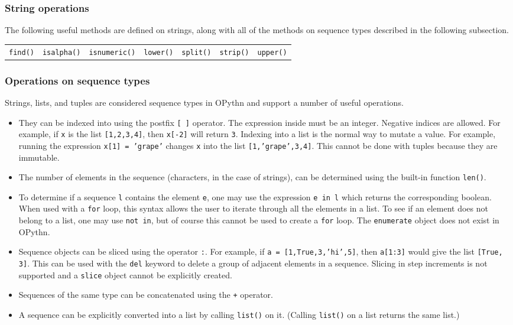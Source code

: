 \documentclass[11pt, twoside]{article}
\newcommand{\ms}{\texttt}
\begin{document}
    \subsubsection{String operations}
    The following useful methods are defined on strings, along with all of the methods on sequence types described in the following subsection.
    \begin{center}
        \begin{tabular}{ccccccc}
            \ms{find()} & \ms{isalpha()} & \ms{isnumeric()} & \ms{lower()} & \ms{split()} & \ms{strip()} & \ms{upper()}\\
    \end{tabular}
    \end{center}

    \subsubsection{Operations on sequence types}
    Strings, lists, and tuples are considered sequence types in OPythn and support a number of useful operations.
    \begin{itemize}
        \item They can be indexed into using the postfix \ms{[ ]} operator. The expression inside must be an integer. Negative indices are allowed. For example, if \ms{x} is the list \ms{[1,2,3,4]}, then \ms{x[-2]} will return \ms{3}. Indexing into a list is the normal way to mutate a value. For example, running the expression \ms{x[1] = 'grape'} changes \ms{x} into the list \ms{[1,'grape',3,4]}. This cannot be done with tuples because they are immutable.
        \item The number of elements in the sequence (characters, in the case of strings), can be determined using the built-in function \ms{len()}.
        \item To determine if a sequence \ms{l} contains the element \ms{e}, one may use the expression \ms{e in l} which returns the corresponding boolean. When used with a \ms{for} loop, this syntax allows the user to iterate through all the elements in a list. To see if an element does not belong to a list, one may use \ms{not in}, but of course this cannot be used to create a \ms{for} loop. The \ms{enumerate} object does not exist in OPythn.
        \item Sequence objects can be sliced using the operator \ms{:}. For example, if \ms{a = [1,True,3,'hi',5]}, then \ms{a[1:3]} would give the list \ms{[True, 3]}. This can be used with the \ms{del} keyword to delete a group of adjacent elements in a sequence. Slicing in step increments is not supported and a \ms{slice} object cannot be explicitly created.
        \item Sequences of the same type can be concatenated using the \ms{+} operator.
        \item A sequence can be explicitly converted into a list by calling \ms{list()} on it. (Calling \ms{list()} on a list returns the same list.)
    \end{itemize}
\end{document}
